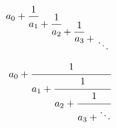 \documentclass{article}
\begin{document}
	\newcommand*{\cofrac}[2]{%
		{%
			\rlap{$\dfrac{1}{\phantom{#1}}$}%
			\genfrac{}{}{0pt}{0}{}{#1+#2}%
		}%
	}
	\[
	a_0 +
	\cofrac{a_1}{
		\cofrac{a_2}{
			\cofrac{a_3}{
				\genfrac{}{}{0pt}{0}{}{\ddots}
	}}}
	\]
	
	\begin{equation*}
		a_0+\cfrac{1}{a_1+\cfrac{1}{a_2+\cfrac{1}{a_3+\ddots}}}
	\end{equation*}
\end{document}
